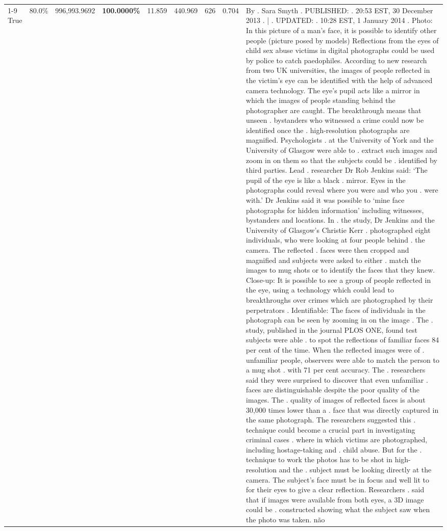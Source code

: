 \begin{table}[H]
\begin{tabular}{lllrlllll}
\cline{1-9}
True & 80.0\% & 996,993.9692 & \bfseries \color{red} 100.0000\% & 11.859 & 440.969 & 626 & 0.704 & By . Sara Smyth . PUBLISHED: . 20:53 EST, 30 December 2013 . | . UPDATED: . 10:28 EST, 1 January 2014 . Photo: In this picture of a man's face, it is possible to identify other people (picture posed by models) Reflections from the eyes of child sex abuse victims in digital photographs could be used by police to catch paedophiles. According to new research from two UK universities, the images of people reflected in the victim's eye can be identified with the help of advanced camera technology. The eye's pupil acts like a mirror in which the images of people standing behind the photographer are caught. The breakthrough means that unseen . bystanders who witnessed a crime could now be identified once the . high-resolution photographs are magnified. Psychologists . at the University of York and the University of Glasgow were able to . extract such images and zoom in on them so that the subjects could be . identified by third parties. Lead . researcher Dr Rob Jenkins said: ‘The pupil of the eye is like a black . mirror. Eyes in the photographs could reveal where you were and who you . were with.' Dr Jenkins said it was possible to ‘mine face photographs for hidden information' including witnesses, bystanders and locations. In . the study, Dr Jenkins and the University of Glasgow's Christie Kerr . photographed eight individuals, who were looking at four people behind . the camera. The reflected . faces were then cropped and magnified and subjects were asked to either . match the images to mug shots or to identify the faces that they knew. Close-up: It is possible to see a group of people reflected in the eye, using a technology which could lead to breakthroughs over crimes which are photographed by their perpetrators . Identifiable: The faces of individuals in the photograph can be seen by zooming in on the image . The . study, published in the journal PLOS ONE, found test subjects were able . to spot the reflections of familiar faces 84 per cent of the time. When the reflected images were of . unfamiliar people, observers were able to match the person to a mug shot . with 71 per cent accuracy. The . researchers said they were surprised to discover that even unfamiliar . faces are distinguishable despite the poor quality of the images. The . quality of images of reflected faces is about 30,000 times lower than a . face that was directly captured in the same photograph. The researchers suggested this . technique could become a crucial part in investigating criminal cases . where in which victims are photographed, including hostage-taking and . child abuse. But for the . technique to work the photos has to be shot in high-resolution and the . subject must be looking directly at the camera. The subject's face must be in focus and well lit to for their eyes to give a clear reflection. Researchers . said that if images were available from both eyes, a 3D image could be . constructed showing what the subject saw when the photo was taken. não \\

\end{tabular}
\end{table}
